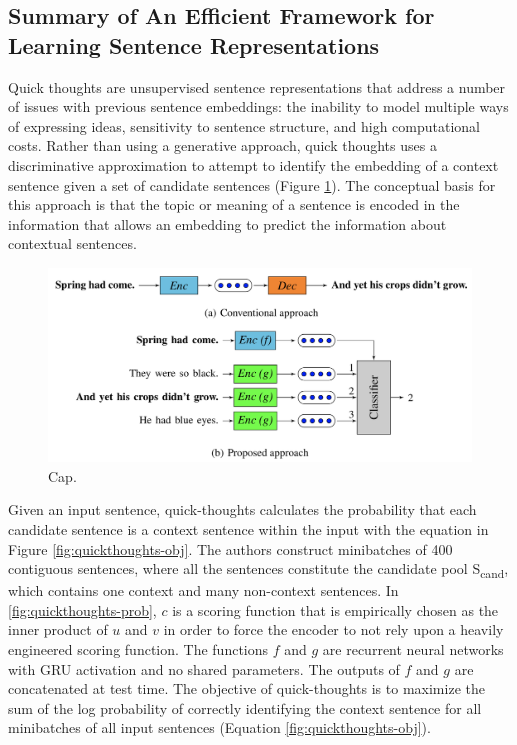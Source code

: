 \subsection{Summary of An Efficient Framework for Learning Sentence Representations}

Quick thoughts  \cite{logeswaran2018an} are unsupervised sentence representations that address a number of issues with previous sentence embeddings: the inability to model multiple ways of expressing ideas, sensitivity to sentence structure, and high computational costs. Rather than using a generative approach, quick thoughts uses a discriminative approximation to attempt to identify the embedding of a context sentence given a set of candidate sentences (Figure \ref{fig:quickthoughts-1}). The conceptual basis for this approach is that the topic or meaning of a sentence is encoded in the information that allows an embedding to predict the information about contextual sentences. 


\begin{figure}[h!]
\centering
  \includegraphics[width=.8\linewidth]{files/quickthoughts-1.png}
  \caption{Cap.}
  \label{fig:quickthoughts-1}
\end{figure}

Given an input sentence, quick-thoughts calculates the probability that each candidate sentence is a context sentence within the input with the equation in Figure \ref{fig:quickthoughts-obj}. The authors construct minibatches of 400 contiguous sentences, where all the sentences constitute the candidate pool S\textsubscript{cand}, which contains one context and many non-context sentences. In \ref{fig:quickthoughts-prob}, $c$ is a scoring function that is empirically chosen as the inner product of $u$ and $v$ in order to force the encoder to not rely upon a heavily engineered scoring function. The functions $f$ and $g$ are recurrent neural networks with GRU activation and no shared parameters. The outputs of $f$ and $g$ are concatenated at test time. The objective of quick-thoughts is to maximize the sum of the log probability of correctly identifying the context sentence for all minibatches of all input sentences (Equation \ref{fig:quickthoughts-obj}).


